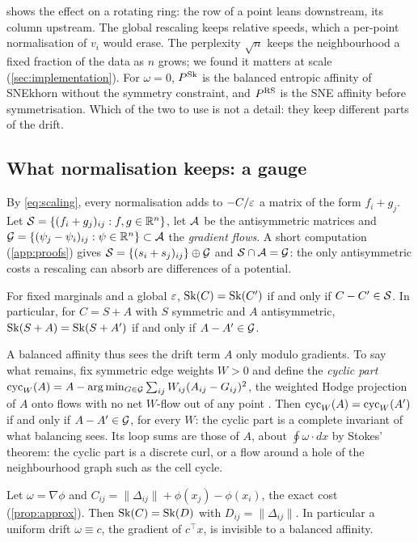  shows the effect on a rotating ring: the row
of a point leans downstream, its column upstream. The global rescaling
keeps relative speeds, which a per-point normalisation of $v_i$ would
erase. The perplexity $\sqrt n$ keeps the
neighbourhood a fixed fraction of the data as $n$ grows; we found it
matters at scale (\cref{sec:implementation}). For $\omega=0$,
$P^{\operatorname{Sk}}$ is the balanced entropic affinity of SNEkhorn without the
symmetry constraint, and $P^{\operatorname{RS}}$ is the SNE affinity before
symmetrisation. Which of the two to use is not a detail: they keep
different parts of the drift.

\subsection{What normalisation keeps: a gauge}
\label{sec:gauge}

By \eqref{eq:scaling}, every normalisation adds to $-C/\varepsilon$ a matrix of
the form $f_i+g_j$. Let $\mathcal{S}=\{(f_i+g_j)_{ij}:f,g\in\mathbb{R}^n\}$, let $\mathcal{A}$
be the antisymmetric matrices and
$\mathcal{G}=\{(\psi_j-\psi_i)_{ij}:\psi\in\mathbb{R}^n\}\subset\mathcal{A}$ the
\emph{gradient flows}. A short computation (\cref{app:proofs}) gives
$\mathcal{S}=\{(s_i+s_j)_{ij}\}\oplus\mathcal{G}$ and $\mathcal{S}\cap\mathcal{A}=\mathcal{G}$: the only
antisymmetric costs a rescaling can absorb are differences of a
potential.

\begin{theorem}
  \label{thm:identifiability}
  For fixed marginals and a global $\varepsilon$, $\operatorname{Sk}(C)=\operatorname{Sk}(C')$ if and only if
  $C-C'\in\mathcal{S}$. In particular, for $C=S+A$ with $S$ symmetric and $A$
  antisymmetric, $\operatorname{Sk}(S+A)=\operatorname{Sk}(S+A')$ if and only if $A-A'\in\mathcal{G}$.
\end{theorem}

A balanced affinity thus sees the drift term $A$ only modulo gradients.
To say what remains, fix symmetric edge weights $W>0$ and define the
\emph{cyclic part} $\operatorname{cyc}_W(A)=A-\arg\min_{G\in\mathcal{G}}\sum_{ij}W_{ij}(A_{ij}-G_{ij})^2$,
the weighted Hodge projection of $A$ onto flows with no net $W$-flow out
of any point \citep{jiang2011statistical,lim2020hodge}. Then
$\operatorname{cyc}_W(A)=\operatorname{cyc}_W(A')$ if and only if $A-A'\in\mathcal{G}$, for every $W$:
the cyclic part is a complete invariant of what balancing sees. Its loop
sums are those of $A$, about $\oint\omega\cdot dx$ by Stokes' theorem:
the cyclic part is a discrete curl, or a flow around a hole of the
neighbourhood graph such as the cell cycle.

\begin{corollary}
  \label{cor:gauge}
  Let $\omega=\nabla\phi$ and $C_{ij}=\|\Delta_{ij}\|+\phi(x_j)-\phi(x_i)$,
  the exact cost (\cref{prop:approx}). Then $\operatorname{Sk}(C)=\operatorname{Sk}(D)$ with
  $D_{ij}=\|\Delta_{ij}\|$. In particular a uniform drift $\omega\equiv c$,
  the gradient of $c^\top x$, is invisible to a balanced affinity.
\end{corollary}

